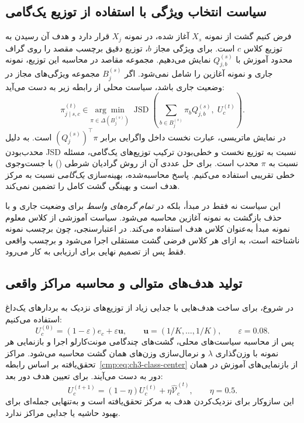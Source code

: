 \subsection{سیاست انتخاب ویژگی با استفاده از توزیع یک‌گامی}
\label{subsec:ch4-center-observation-local-policy}
فرض کنیم گشت از نمونه $X_s$ آغاز شده، در نمونه $X_j$ قرار دارد و هدف آن رسیدن به توزیع کلاس $c$ است. برای ویژگی مجاز $b$، توزیع دقیق برچسب مقصد را روی گراف محدود آموزش با $Q_{j,b}^{(s)}$ نمایش می‌دهیم. مجموعه مقاصد در محاسبه این توزیع، نمونه جاری و نمونه آغازین را شامل نمی‌شود. اگر $B_j^{(s)}$ مجموعه ویژگی‌های مجاز در وضعیت جاری باشد، سیاست محلی از رابطه زیر به دست می‌آید:
\begin{equation}\label{eq:ch4-center-observation-policy}
\boxed{
\pi_{j\mid s,c}^{(t)}\in
\underset{\pi\in\Delta(B_j^{(s)})}{\arg\min}\;
\operatorname{JSD}\left(
\sum_{b\in B_j^{(s)}}\pi_bQ_{j,b}^{(s)},\;U_c^{(t)}\right).
}
\end{equation}
در نمایش ماتریسی، عبارت نخست داخل واگرایی برابر $(Q_j^{(s)})^\top\pi$ است. به دلیل محدب‌بودن JSD نسبت به توزیع نخست و خطی‌بودن ترکیب توزیع‌های یک‌گامی، مسئله نسبت به $\pi$ محدب است. برای حل عددی آن از روش گرادیان شرطی () با جست‌وجوی خطی تقریبی استفاده می‌کنیم. پاسخ محاسبه‌شده، بهینه‌سازی \emph{یک‌گامی} نسبت به مرکز هدف است و بهینگی گشت کامل را تضمین نمی‌کند.

این سیاست نه فقط در مبدأ، بلکه در \emph{تمام گره‌های واسط} برای وضعیت جاری و با حذف بازگشت به نمونه آغازین محاسبه می‌شود. سیاست آموزشی از کلاس معلوم نمونه مبدأ به‌عنوان کلاس هدف استفاده می‌کند. در اعتبارسنجی، چون برچسب نمونه ناشناخته است، به ازای هر کلاس فرضی گشت مستقلی اجرا می‌شود و برچسب واقعی فقط پس از تصمیم نهایی برای ارزیابی به کار می‌رود.

\subsection{تولید هدف‌های متوالی و محاسبه مراکز واقعی}
\label{subsec:ch4-center-observation-iteration}
در شروع، برای ساخت هدف‌هایی با جدایی زیاد از توزیع‌های نزدیک به بردارهای یک‌داغ استفاده می‌کنیم:
\begin{equation}\label{eq:ch4-center-observation-initial-target}
U_c^{(0)}=(1-\varepsilon)e_c+\varepsilon\boldsymbol u,\qquad
\boldsymbol u=(1/K,\ldots,1/K),\qquad\varepsilon=0.08.
\end{equation}
پس از محاسبه سیاست‌های محلی، گشت‌های چندگامی مونت‌کارلو اجرا
و بازنمایی هر نمونه با وزن‌گذاری $\lambda$ و نرمال‌سازی
وزن‌های همان گشت محاسبه می‌شود. مراکز تحقق‌یافته بر اساس
رابطه~\eqref{cmp:eq:ch3-class-center} از بازنمایی‌های آموزش
در همان دور به دست می‌آیند. برای تعیین هدف دور بعد:
\begin{equation}\label{eq:ch4-center-observation-update}
\boxed{U_c^{(t+1)}=(1-\eta)U_c^{(t)}+
\eta\widehat{\mathcal V}_c^{(t)},\qquad\eta=0.5.}
\end{equation}
این سازوکار برای نزدیک‌کردن هدف به مرکز تحقق‌یافته است
و به‌تنهایی جمله‌ای برای بهبود حاشیه یا جدایی مراکز ندارد.

